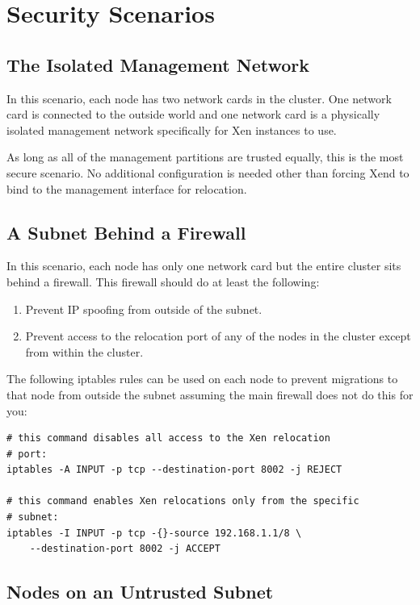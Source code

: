 \documentclass[11pt,twoside,final,openright]{report}
\begin{document}
\section{Security Scenarios}


\subsection{The Isolated Management Network}

In this scenario, each node has two network cards in the cluster. One
network card is connected to the outside world and one network card is a
physically isolated management network specifically for Xen instances to
use.

As long as all of the management partitions are trusted equally, this is
the most secure scenario. No additional configuration is needed other
than forcing Xend to bind to the management interface for relocation.


\subsection{A Subnet Behind a Firewall}

In this scenario, each node has only one network card but the entire
cluster sits behind a firewall. This firewall should do at least the
following:

\begin{enumerate}
\item Prevent IP spoofing from outside of the subnet.
\item Prevent access to the relocation port of any of the nodes in the
  cluster except from within the cluster.
\end{enumerate}

The following iptables rules can be used on each node to prevent
migrations to that node from outside the subnet assuming the main
firewall does not do this for you:

\begin{verbatim}
# this command disables all access to the Xen relocation
# port:
iptables -A INPUT -p tcp --destination-port 8002 -j REJECT

# this command enables Xen relocations only from the specific
# subnet:
iptables -I INPUT -p tcp -{}-source 192.168.1.1/8 \
    --destination-port 8002 -j ACCEPT
\end{verbatim}

\subsection{Nodes on an Untrusted Subnet}
\end{document}
